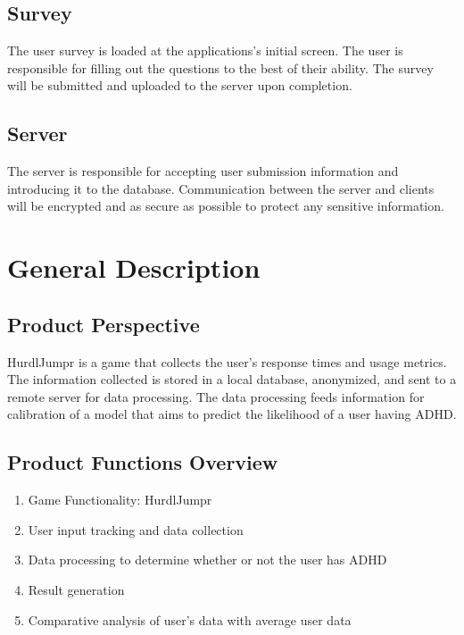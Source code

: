\documentclass[a4wide]{article}
\begin{document}
\subsection{Survey}

The user survey is loaded at the applications's initial screen.
The user is responsible for filling out the questions to the best of their ability.
The survey will be submitted and uploaded to the server upon completion. 

\subsection{Server}

The server is responsible for accepting user submission information and introducing it to the database.
Communication between the server and clients will be encrypted and as secure as possible to protect any sensitive information.


\section{General Description}

\subsection{Product Perspective}

HurdlJumpr is a game that collects the user's response times and usage metrics.
The information collected is stored in a local database, anonymized, and sent to
a remote server for data processing. The data processing feeds information for
calibration of a model that aims to predict the likelihood of a user having
ADHD.

\subsection{Product Functions Overview}

\begin{enumerate}
\item Game Functionality: HurdlJumpr
\item User input tracking and data collection
\item Data processing to determine whether or not the user has ADHD
\item Result generation
\item Comparative analysis of user's data with average user data
\end{enumerate}
\end{document}

